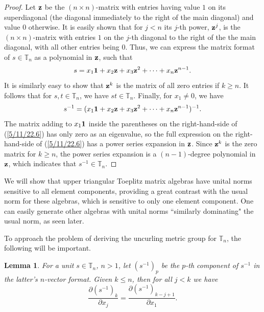 \documentclass{amsart}
\numberwithin{equation}{section}
\newtheorem{lemma}[theorem]{Lemma}
\theoremstyle{definition}
\numberwithin{theorem}{section}
\begin{document}
 \begin{proof}
Let ${\bf z}$ be the $(n \times n)$-matrix with entries having value $1$ on its superdiagonal  (the diagonal immediately to the right of the main diagonal) and value $0$ otherwise.  It is easily shown that for $j<n$ its $j$-th power, ${\bf z}^j$, is the $(n\times n)$-matrix with entries $1$ on the $j$-th diagonal to the right of the the main diagonal, with all other entries being $0$.   Thus, we can express the matrix format of $s\in\mathbb{T}_n$ as a polynomial in ${\bf z}$, such that
\begin{equation}\label{5/11/22.5} s = x_1 {\bf 1} + x_2 {\bf z} + x_3 {\bf z}^2 + \cdots + x_n {\bf z}^{n-1}.\end{equation}  It is similarly easy to show that ${\bf z}^k$ is the matrix of all zero entries if $k\ge n$.  It follows that for $s,t\in \mathbb{T}_n$, we have $st\in \mathbb{T}_n$.   Finally, for $x_1\ne 0$, we have \begin{equation}\label{5/11/22.6} s^{-1} =  (x_1 {\bf 1} + x_2 {\bf z} + x_3 {\bf z}^2 + \cdots + x_n {\bf z}^{n-1})^{-1}.\end{equation}  The matrix adding to $x_1{\bf 1}$ inside the parentheses on the right-hand-side of (\ref{5/11/22.6}) has only zero as an eigenvalue, so the full expression on the right-hand-side of (\ref{5/11/22.6}) has a power series expansion in ${\bf z}$.  Since ${\bf z}^k$ is the zero matrix for $k\ge n$, the power series expansion is  a $(n-1)$-degree polynomial in ${\bf z}$, which indicates that $s^{-1}\in \mathbb{T}_n$.
 \end{proof}
 
We will show that upper triangular Toeplitz matrix algebras have unital norms sensitive to all element components, providing a great contrast with the usual norm for these algebras, which is sensitive to only one element component.  One can easily generate other algebras with unital norms ``similarly dominating" the usual norm, as seen later.

To approach the problem of deriving the uncurling metric group for $\mathbb{T}_n$, the following will be important.

\begin{lemma} \label{5/7/22.15} For a unit $s\in \mathbb{T}_n$,  $n>1$, let $\left( s^{-1} \right)_p$ be the $p$-th component of $s^{-1}$ in the latter's $n$-vector format.  Given $k\le n$, then for all $j<k$ we have \begin{equation}\label{5/6/22.10} \frac{\partial \left( s^{-1} \right)_k}{\partial x_j} = \frac{\partial \left( s^{-1} \right)_{k-j+1}}{\partial x_1}.\end{equation}
\end{lemma}
\end{document}
